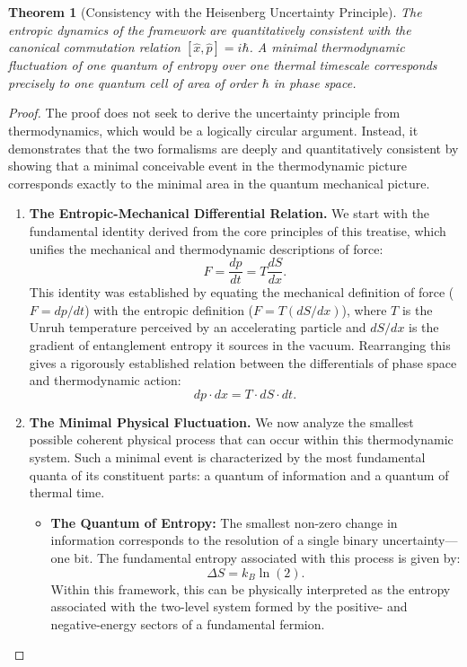 \documentclass[11pt, letterpaper]{report}
\theoremstyle{plain} %
\newtheorem{theorem}{Theorem}[chapter]
\theoremstyle{definition} %
\theoremstyle{remark} %
\begin{document}
\begin{theorem}[Consistency with the Heisenberg Uncertainty Principle]
\label{thm:verify_hup}
The entropic dynamics of the framework are quantitatively consistent with the canonical commutation relation $[\hat{x}, \hat{p}] = i\hbar$. A minimal thermodynamic fluctuation of one quantum of entropy over one thermal timescale corresponds precisely to one quantum cell of area of order $\hbar$ in phase space.
\end{theorem}
\begin{proof}
The proof does not seek to derive the uncertainty principle from thermodynamics, which would be a logically circular argument. Instead, it demonstrates that the two formalisms are deeply and quantitatively consistent by showing that a minimal conceivable event in the thermodynamic picture corresponds exactly to the minimal area in the quantum mechanical picture.

\begin{enumerate}
    \item \textbf{The Entropic-Mechanical Differential Relation.} We start with the fundamental identity derived from the core principles of this treatise, which unifies the mechanical and thermodynamic descriptions of force:
    $$ F = \frac{dp}{dt} = T \frac{dS}{dx}. $$
    This identity was established by equating the mechanical definition of force ($F=dp/dt$) with the entropic definition ($F=T(dS/dx)$), where $T$ is the Unruh temperature perceived by an accelerating particle and $dS/dx$ is the gradient of entanglement entropy it sources in the vacuum. Rearranging this gives a rigorously established relation between the differentials of phase space and thermodynamic action:
    \begin{equation}
        dp \cdot dx = T \cdot dS \cdot dt.
        \label{eq:verify_differential_relation}
    \end{equation}

    \item \textbf{The Minimal Physical Fluctuation.} We now analyze the smallest possible coherent physical process that can occur within this thermodynamic system. Such a minimal event is characterized by the most fundamental quanta of its constituent parts: a quantum of information and a quantum of thermal time.
        \begin{itemize}
            \item \textbf{The Quantum of Entropy:} The smallest non-zero change in information corresponds to the resolution of a single binary uncertainty—one bit. The fundamental entropy associated with this process is given by:
            \begin{equation}
                \Delta S = k_B \ln(2).
            \end{equation}
            Within this framework, this can be physically interpreted as the entropy associated with the two-level system formed by the positive- and negative-energy sectors of a fundamental fermion.


\end{itemize}
\end{enumerate}
\end{proof}
\end{document}
